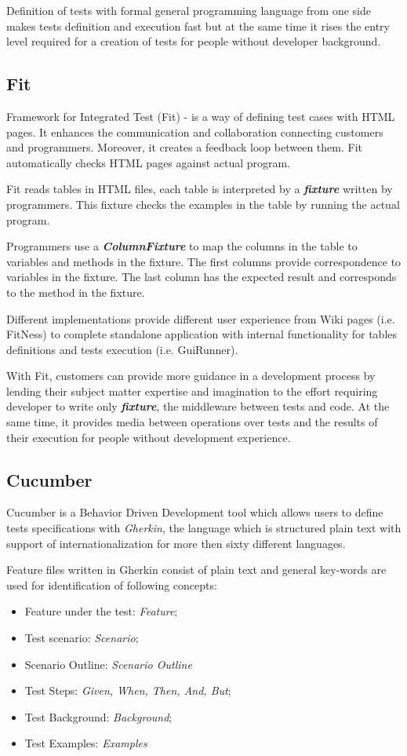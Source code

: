 Definition of tests with formal general programming language from one side makes tests definition and execution fast but at the same time it rises the entry level required for a creation of tests for people without developer background. 

\subsection{Fit}
Framework for Integrated Test (Fit) - is a way of defining test cases with HTML pages. It enhances the communication and collaboration connecting customers and programmers. Moreover, it creates a feedback loop between them. Fit automatically checks HTML pages against actual program\cite{fit}.

Fit reads tables in HTML files, each table is interpreted by a \textit{\textbf{fixture}} written by programmers. This fixture checks the examples in the table by running the actual program\cite{fitIntro}.

Programmers use a \textit{\textbf{ColumnFixture}} to map the columns in the table to variables and methods in the fixture. The first columns provide correspondence to variables in the fixture. The last column has the expected result and corresponds to the method in the fixture\cite{fitIntro}.

Different implementations provide different user experience from Wiki pages (i.e. FitNess) to complete standalone application with internal functionality for tables definitions and tests execution (i.e. GuiRunner).

With Fit, customers can provide more guidance in a development process by lending their subject matter expertise and imagination to the effort\cite{fit} requiring developer to write only \textit{\textbf{fixture}}, the middleware between tests and code. At the same time, it provides media between operations over tests and the results of their execution for people without development experience.

\subsection{Cucumber}
Cucumber is a Behavior Driven Development tool which allows users to define tests specifications with \textit{Gherkin}, the language which is structured plain text with support of internationalization for more then sixty different languages\cite{cuceRef}.

Feature files written in Gherkin consist of plain text and general key-words are used for identification of following concepts:
\begin{itemize}
	\item Feature under the test: \textit{Feature};
	\item Test scenario: \textit{Scenario};
	\item Scenario Outline: \textit{Scenario Outline}
	\item Test Steps: \textit{Given, When, Then, And, But};
	\item Test Background:  \textit{Background};
	\item Test Examples: \textit{Examples}
\end{itemize}

